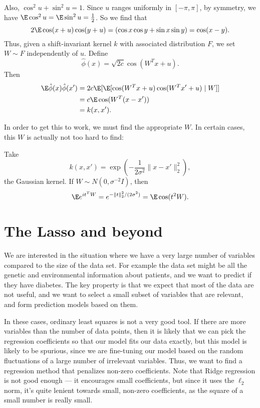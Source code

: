 \documentclass[a4paper]{article}
\begin{document}
Also, $\cos^2 u + \sin^2 u = 1$. Since $u$ ranges uniformly in $[-\pi, \pi]$, by symmetry, we have $\E \cos^2 u = \E \sin^2 u = \frac{1}{2}$. So we find that
\[
  2 \E \cos(x + u) \cos (y + u) = (\cos x \cos y + \sin x \sin y) = \cos (x - y).
\]
Thus, given a shift-invariant kernel $k$ with associated distribution $F$, we set $W \sim F$ independently of $u$. Define
\[
  \hat{\phi}(x) = \sqrt{2c} \cos (W^T x + u).
\]
Then
\begin{align*}
  \E \hat{\phi}(x) \hat{\phi}(x') &= 2c \E[\E[\cos (W^T x + u) \cos (W^T x' + u) \mid W]]\\
  &= c \E \cos(W^T (x - x'))\\
  &= k(x, x').
\end{align*}

In order to get this to work, we must find the appropriate $W$. In certain cases, this $W$ is actually not too hard to find:
\begin{eg}
  Take
  \[
    k(x, x') = \exp\left(-\frac{1}{2\sigma^2} \|x - x'\|_2^2\right),
  \]
  the Gaussian kernel. If $W \sim N(0, \sigma^{-2} I)$, then
  \[
    \E e^{it^TW} = e^{-\|t\|_2^2/(2\sigma^2)} = \E \cos(t^2 W).
  \]
\end{eg}

\section{The Lasso and beyond}
We are interested in the situation where we have a very large number of variables compared to the size of the data set. For example the data set might be all the genetic and environmental information about patients, and we want to predict if they have diabetes. The key property is that we expect that most of the data are not useful, and we want to select a small subset of variables that are relevant, and form prediction models based on them.

In these cases, ordinary least squares is not a very good tool. If there are more variables than the number of data points, then it is likely that we can pick the regression coefficients so that our model fits our data exactly, but this model is likely to be spurious, since we are fine-tuning our model based on the random fluctuations of a large number of irrelevant variables. Thus, we want to find a regression method that penalizes non-zero coefficients. Note that Ridge regression is not good enough --- it encourages small coefficients, but since it uses the $\ell_2$ norm, it's quite lenient towards small, non-zero coefficients, as the square of a small number is really small.
\end{document}
